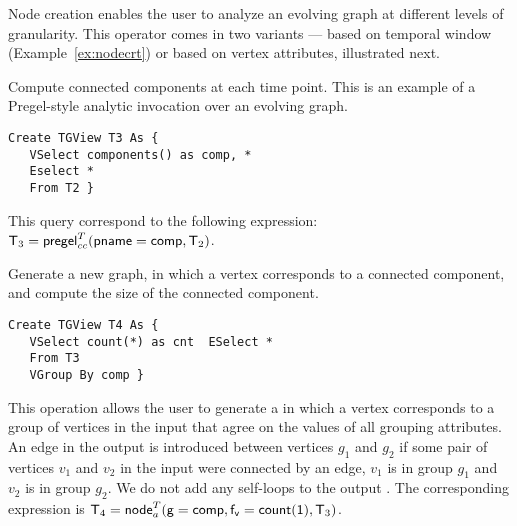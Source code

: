 Node creation enables the user to analyze an evolving graph at
different levels of granularity.  This operator comes in two variants
--- based on temporal window (Example~\ref{ex:nodecrt}) or based
on vertex attributes, illustrated next.

\begin{example}
\label{ex:cc}

Compute connected components at each time point.  This is an
  example of a Pregel-style analytic invocation over an evolving
  graph.

\begin{small} 
\begin{verbatim}
Create TGView T3 As { 
   VSelect components() as comp, *
   Eselect *
   From T2 }
\end{verbatim}
\end{small}

This query correspond to the following \tra expression:
$\mathsf{T}_3 = \textsf{pregel}^T_{cc} (\mathsf{pname=comp}, \mathsf{T}_2)$.

\end{example}



\begin{example}
\label{ex:nodecra}

Generate a new graph, in which a vertex corresponds to a connected
component, and compute the size of the connected component.  

\begin{small} 
\begin{verbatim}
Create TGView T4 As { 
   VSelect count(*) as cnt  ESelect *
   From T3
   VGroup By comp }
\end{verbatim}
\end{small}

\end{example}

This operation allows the user to generate a \tg in which a vertex
corresponds to a group of vertices in the input that agree on the
values of all grouping attributes.  An edge in the output is
introduced between vertices $g_1$ and $g_2$ if some pair of vertices
$v_1$ and $v_2$ in the input \tg were connected by an edge, $v_1$ is
in group $g_1$ and $v_2$ is in group $g_2$.  We do not add any
self-loops to the output \tg. The corresponding \tra expression is
$\mathsf{T}_4 = \textsf{node}^T_a(\mathsf{g=comp,f_v=count(1)},\mathsf{T}_3)$.

